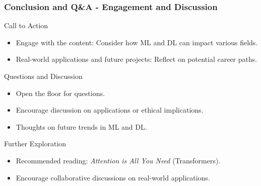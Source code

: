 \documentclass[aspectratio=169]{beamer}
\begin{document}
\begin{frame}[fragile]
    \frametitle{Conclusion and Q\&A - Engagement and Discussion}
    \begin{block}{Call to Action}
        \begin{itemize}
            \item Engage with the content: Consider how ML and DL can impact various fields.
            \item Real-world applications and future projects: Reflect on potential career paths.
        \end{itemize}
    \end{block}

    \begin{block}{Questions and Discussion}
        \begin{itemize}
            \item Open the floor for questions.
            \item Encourage discussion on applications or ethical implications.
            \item Thoughts on future trends in ML and DL.
        \end{itemize}
    \end{block}

    \begin{block}{Further Exploration}
        \begin{itemize}
            \item Recommended reading: \textit{Attention is All You Need} (Transformers).
            \item Encourage collaborative discussions on real-world applications.
        \end{itemize}
    \end{block}
\end{frame}
\end{document}
